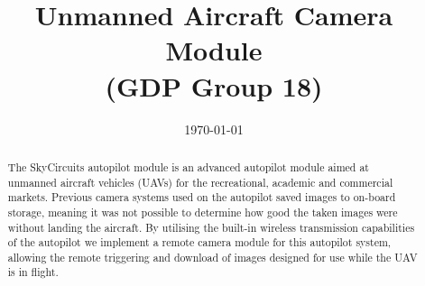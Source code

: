 \documentclass[oneside]{ecsgdp}         %
\begin{document}
\frontmatter
\title      {Unmanned Aircraft Camera Module \\(GDP Group 18)}
\date       {\today}
\subject    {ELEC6050 Group Design Project}
\maketitle
\begin{abstract}
The SkyCircuits autopilot module is an advanced autopilot module aimed at unmanned aircraft vehicles (UAVs) for the recreational, academic and commercial markets. Previous camera systems used on the autopilot saved images to on-board storage, meaning it was not possible to determine how good the taken images were without landing the aircraft. By utilising the built-in wireless transmission capabilities of the autopilot we implement a remote camera module for this autopilot system, allowing the remote triggering and download of images designed for use while the UAV is in flight.

\end{abstract}
\tableofcontents
\listoffigures
\listoftables
\lstlistoflistings
{}
\mainmatter



\newpage

\newpage

\newpage

\newpage

\newpage
%

\newpage

\newpage

\newpage
%

\newpage

\newpage

\newpage

\newpage
\end{document}
